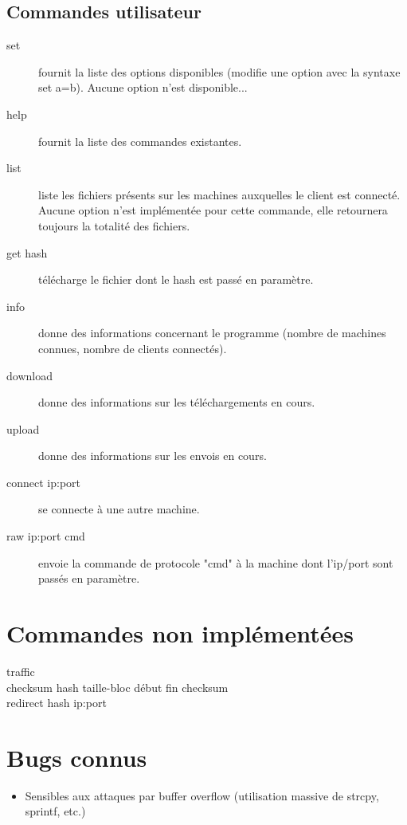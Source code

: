 \subsection{Commandes utilisateur}
\begin{description}
    \item[set] fournit la liste des options disponibles (modifie une option avec
la syntaxe set a=b). Aucune option n'est disponible...
    \item[help] fournit la liste des commandes existantes.
    \item[list] liste les fichiers présents sur les machines auxquelles le
client est connecté. Aucune option n'est implémentée pour cette commande, elle
retournera toujours la totalité des fichiers.
    \item[get hash] télécharge le fichier dont le hash est passé en paramètre. 
    \item[info] donne des informations concernant le programme (nombre de
machines connues, nombre de clients connectés).
    \item[download] donne des informations sur les téléchargements en cours.
    \item[upload] donne des informations sur les envois en cours.
    \item[connect ip:port] se connecte à une autre machine.
    \item[raw ip:port cmd] envoie la commande de protocole "cmd" à la machine
dont l'ip/port sont passés en paramètre.
\end{description}



\section{Commandes non implémentées}
\begin{description}
    \item[traffic]
    \item[checksum hash taille-bloc début fin checksum] 
    \item[redirect hash ip:port]

\end{description}
\section{Bugs connus}
\begin{itemize}
    \item Sensibles aux attaques par buffer overflow (utilisation massive de
strcpy, sprintf, etc.)
\end{itemize}
